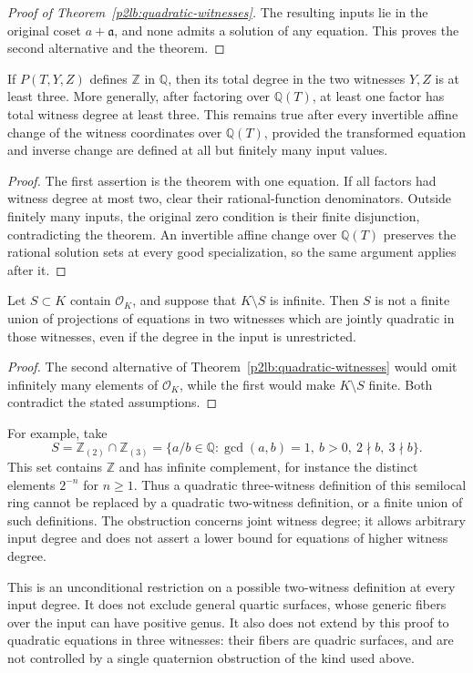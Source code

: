 \begin{proof}[Proof of Theorem~\ref{p2lb:quadratic-witnesses}]
The resulting inputs lie in the original coset $a+\mathfrak a$,
and none admits a solution of any equation.  This proves the second
alternative and the theorem.
\end{proof}

\begin{corollary}\label{p2lb:two-witness-degree-three}
If $P(T,Y,Z)$ defines $\mathbb Z$ in $\mathbb Q$, then its total
degree in the two witnesses $Y,Z$ is at least three.  More generally,
after factoring over $\mathbb Q(T)$, at least one factor has total
witness degree at least three.  This remains true after every
invertible affine change of the witness coordinates over
$\mathbb Q(T)$, provided the transformed equation and inverse change
are defined at all but finitely many input values.
\end{corollary}
\begin{proof}
The first assertion is the theorem with one equation.  If all factors
had witness degree at most two, clear their rational-function
denominators.  Outside finitely many inputs, the original zero condition
is their finite disjunction, contradicting the theorem.  An invertible
affine change over $\mathbb Q(T)$ preserves the rational solution sets
at every good specialization, so the same argument applies after it.
\end{proof}

\begin{corollary}\label{p2lb:conic-integral-superset}
Let $S\subset K$ contain $\mathcal O_K$, and suppose that $K\setminus S$
is infinite.  Then $S$ is not a finite union of projections of equations
in two witnesses which are jointly quadratic in those witnesses, even if
the degree in the input is unrestricted.
\end{corollary}
\begin{proof}
The second alternative of Theorem~\ref{p2lb:quadratic-witnesses} would
omit infinitely many elements of $\mathcal O_K$, while the first would
make $K\setminus S$ finite.  Both contradict the stated assumptions.
\end{proof}

For example, take
\[
 S=\mathbb Z_{(2)}\cap\mathbb Z_{(3)}
   =\{a/b\in\mathbb Q:\gcd(a,b)=1,\ b>0,\ 2\nmid b,\ 3\nmid b\}.
\]
This set contains $\mathbb Z$ and has infinite complement, for instance
the distinct elements $2^{-n}$ for $n\ge1$.  Thus a quadratic
three-witness definition of this semilocal ring cannot be replaced by a
quadratic two-witness definition, or a finite union of such definitions.
The obstruction concerns joint witness degree; it allows arbitrary input
degree and does not assert a lower bound for equations of higher witness
degree.

This is an unconditional restriction on a possible two-witness
definition at every input degree.  It does not exclude general quartic
surfaces, whose generic fibers over the input can have positive genus.
It also does not extend by this proof to quadratic equations in three
witnesses: their fibers are quadric surfaces, and are not controlled by
a single quaternion obstruction of the kind used above.
